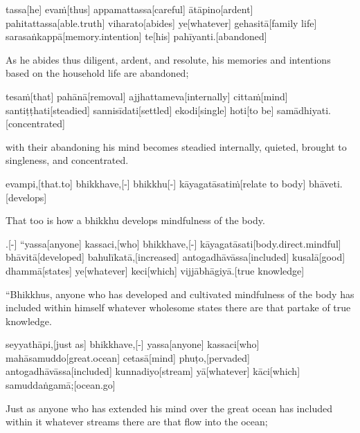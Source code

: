 \begin{samepage}
\begingl[glneveryline={\PaliGlossA,\PaliGlossB}]
tassa[he] evaṁ[thus] appamattassa[careful] ātāpino[ardent] pahitattassa[able.truth] viharato[abides] ye[whatever] gehasitā[family life] sarasaṅkappā[memory.intention] te[his] pahīyanti.[abandoned]
\endgl
\nopagebreak
\linespread{0.5}
\begin{spacin}{0.2}
{\PaliGlossFT As he abides thus diligent, ardent, and resolute, his memories and intentions based on the household life are abandoned;}
\end{spacin}
\vskip 12pt
\end{samepage}
\begin{samepage}
\begingl[glneveryline={\PaliGlossA,\PaliGlossB}]
tesaṁ[that] pahānā[removal] ajjhattameva[internally] cittaṁ[mind] santiṭṭhati[steadied] sannisīdati[settled] ekodi[single] hoti[to be] samādhiyati.[concentrated]
\endgl
\nopagebreak
\linespread{0.5}
\begin{spacin}{0.2}
{\PaliGlossFT with their abandoning his mind becomes steadied internally, quieted, brought to singleness, and concentrated.}
\end{spacin}
\vskip 12pt
\end{samepage}
\begin{samepage}
\begingl[glneveryline={\PaliGlossA,\PaliGlossB}]
evampi,[that.to] bhikkhave,[-] bhikkhu[-] kāyagatāsatiṁ[relate to body] bhāveti.[develops]
\endgl
\nopagebreak
\linespread{0.5}
\begin{spacin}{0.2}
{\PaliGlossFT That too is how a bhikkhu develops mindfulness of the body.}
\end{spacin}
\vskip 12pt
\end{samepage}
\vskip 0.2in
\begin{samepage}
.[-] “yassa[anyone] kassaci,[who] bhikkhave,[-] kāyagatāsati[body.direct.mindful] bhāvitā[developed] bahulīkatā,[increased] antogadhāvāssa[included] kusalā[good] dhammā[states] ye[whatever] keci[which] vijjābhāgiyā.[true knowledge]
\endgl
\nopagebreak
\linespread{0.5}
\begin{spacin}{0.2}
{\PaliGlossFT “Bhikkhus, anyone who has developed and cultivated mindfulness of the body has included within himself whatever wholesome states there are that partake of true knowledge.}
\end{spacin}
\vskip 12pt
\end{samepage}
\begin{samepage}
\begingl[glneveryline={\PaliGlossA,\PaliGlossB}]
seyyathāpi,[just as] bhikkhave,[-] yassa[anyone] kassaci[who] mahāsamuddo[great.ocean] cetasā[mind] phuṭo,[pervaded] antogadhāvāssa[included] kunnadiyo[stream] yā[whatever] kāci[which] samuddaṅgamā;[ocean.go]
\endgl
\nopagebreak
\linespread{0.5}
\begin{spacin}{0.2}
{\PaliGlossFT Just as anyone who has extended his mind over the great ocean has included within it whatever streams there are that flow into the ocean;}
\end{spacin}
\vskip 12pt
\end{samepage}
